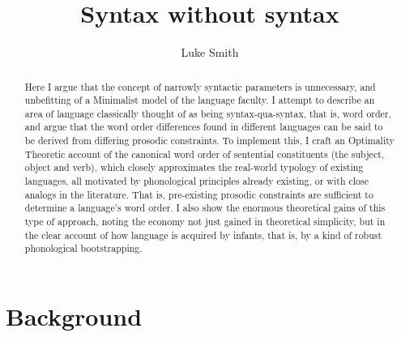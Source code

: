 \documentclass{article}
\title{Syntax without syntax}
\author{Luke Smith}
\begin{document}
\maketitle


\begin{abstract}
Here I argue that the concept of narrowly syntactic parameters is unnecessary, and unbefitting of a Minimalist model of the language faculty.
I attempt to describe an area of language classically thought of as being syntax-qua-syntax, that is, word order, and argue that the word order differences found in different languages can be said to be derived from differing prosodic constraints.
To implement this, I craft an Optimality Theoretic account of the canonical word order of sentential constituents (the subject, object and verb), which closely approximates the real-world typology of existing languages, all motivated by phonological principles already existing, or with close analogs in the literature.
That is, pre-existing prosodic constraints are sufficient to determine a language's word order.
I also show the enormous theoretical gains of this type of approach, noting the economy not just gained in theoretical simplicity, but in the clear account of how language is acquired by infants, that is, by a kind of robust phonological bootstrapping.
\end{abstract}


\onehalfspacing

\section{Background}

\end{document}
